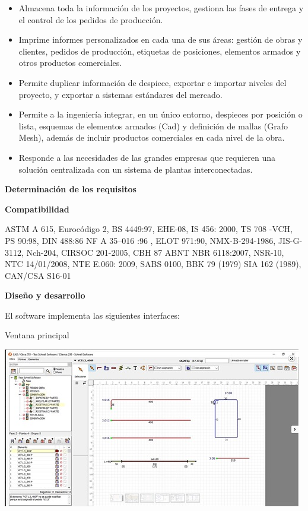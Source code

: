 \documentclass[10pt,a4paper]{article}
\begin{document}
\begin{enumerate}
\begin{itemize}
\item Almacena toda la información de los proyectos, gestiona las fases de entrega y el control de los pedidos de producción.
\item Imprime informes personalizados en cada una de sus áreas: gestión de obras y clientes, pedidos de producción, etiquetas de posiciones, elementos armados y otros productos comerciales.
\item Permite duplicar información de despiece, exportar e importar niveles del proyecto, y exportar a sistemas estándares del mercado.
\item Permite a la ingeniería integrar, en un único entorno, despieces por posición o lista, esquemas de elementos armados (Cad) y definición de mallas (Grafo Mesh), además de incluir productos comerciales en cada nivel de la obra.
\item Responde a las necesidades de las grandes empresas que requieren una solución centralizada con un sistema de plantas interconectadas.
\end{itemize}

\textbf{Determinación de los requisitos}

\textbf{Compatibilidad}

ASTM A 615, Eurocódigo 2, BS 4449:97, EHE-08, IS 456: 2000, TS 708 -VCH, PS 90:98, DIN 488:86 NF A 35–016 :96 , ELOT 971:90, NMX-B-294-1986, JIS-G-3112, Nch-204, CIRSOC 201-2005, CBH 87 ABNT NBR 6118:2007, NSR-10, NTC 14/01/2008, NTE E.060: 2009, SABS 0100, BBK 79 (1979) SIA 162 (1989), CAN/CSA S16-01

\textbf{Diseño y desarrollo}

El software implementa las siguientes interfaces:

\begin{center}
Ventana principal
\end{center}

\includegraphics[scale=1]{GRAPHICO PRO 1.JPG}


\end{enumerate}
\end{document}
